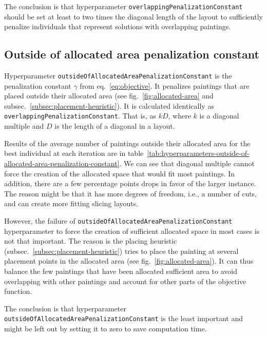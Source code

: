 The conclusion is that hyperparameter \verb|overlappingPenalizationConstant| should be set at least to
two times the diagonal length of the layout to sufficiently penalize individuals that represent solutions with overlapping paintings.

\subsection{Outside of allocated area penalization constant}\label{subsec:outside-of-allocated-area-penalization-constant}
Hyperparameter \verb|outsideOfAllocatedAreaPenalizationConstant| is the penalization constant $\gamma$ from eq.~\ref{eq:objective}.
It penalizes paintings that are placed outside their allocated area (see fig.~\ref{fig:allocated-area} and subsec.~\ref{subsec:placement-heuristic}).
It is calculated identically as \verb|overlappingPenalizationConstant|.
That is, as $kD$, where $k$ is a diagonal multiple and $D$ is the length of a diagonal in a layout.

Results of the average number of paintings outside their allocated area
for the best individual at each iteration are in table~\ref{tab:hyperparameters-outside-of-allocated-area-penalization-constant}.
We can see that diagonal multiple cannot force the creation of the allocated space that would fit most paintings.
In addition, there are a few percentage points drops in favor of the larger instance.
The reason might be that it has more degrees of freedom, i.e., a number of cuts,
and can create more fitting slicing layouts.

However, the failure of \verb|outsideOfAllocatedAreaPenalizationConstant| hyperparameter to force
the creation of sufficient allocated space in most cases is not that important.
The reason is the placing heuristic (subsec.~\ref{subsec:placement-heuristic})
tries to place the painting at several placement points in the allocated area (see fig.~\ref{fig:allocated-area}).
It can thus balance the few paintings that have been allocated sufficient area to avoid overlapping with other paintings
and account for other parts of the objective function.

The conclusion is that hyperparameter \verb|outsideOfAllocatedAreaPenalizationConstant| is the least
important and might be left out by setting it to zero to save computation time.


